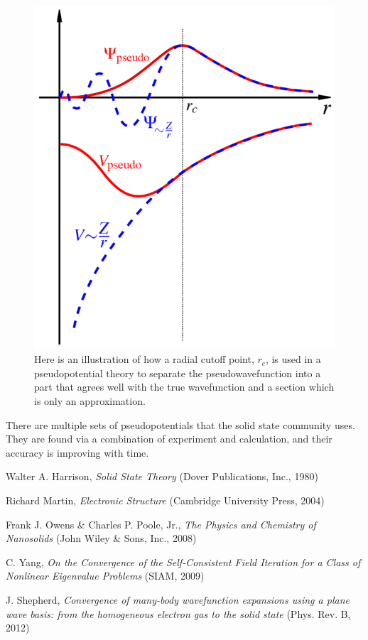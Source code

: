 \documentclass[notitlepage,letter,preprint,prb]{revtex4}
\begin{document}
	\begin{figure}[h!]
	\centering
	\includegraphics[scale=1.5]{Pseudopotentials.png}
	\caption{Here is an illustration of how a radial cutoff point, $r_c$, is used in a pseudopotential theory to separate the pseudowavefunction into a part that agrees well with the true wavefunction and a section which is only an approximation.}
	\end{figure}

	There are multiple sets of pseudopotentials that the solid state community uses.  They are found via a combination of experiment and calculation, and their accuracy is improving with time\citealp{planewave}.  
	
	\begin{thebibliography}{5}
	
	 Walter A. Harrison, \textsl{Solid State Theory} (Dover Publications, Inc., 1980)

	 Richard Martin, \textsl{Electronic Structure} (Cambridge University Press, 2004)

	 Frank J. Owens \& Charles P. Poole, Jr., \textsl{The Physics and Chemistry of Nanosolids} (John Wiley \& Sons, Inc., 2008)

	 C. Yang, \textsl{On the Convergence of the Self-Consistent Field Iteration for a Class of Nonlinear Eigenvalue Problems} (SIAM, 2009)
	
	 J. Shepherd, \textsl{Convergence of many-body wavefunction expansions using a plane wave basis: from the homogeneous electron gas to the solid state} (Phys. Rev. B, 2012)
	
	\end{thebibliography}
	
\end{document}
